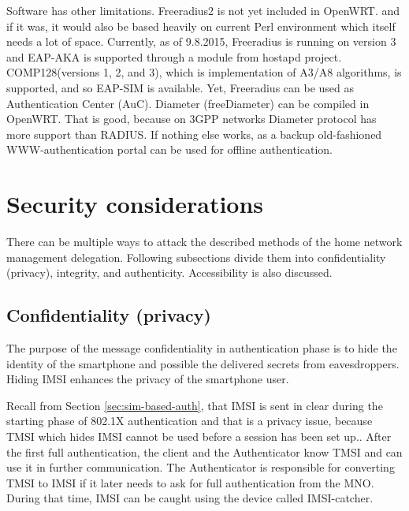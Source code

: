 \documentclass[12pt,a4paper,english]{tutthesis}
\begin{document}
\begin{otherlanguage}{english}
Software has other limitations. Freeradius2 is not yet included  in OpenWRT.
and if it was, it would also be based heavily on current Perl environment which
itself needs a lot of space.
Currently, as of 9.8.2015, Freeradius is running on version 3 and
EAP-AKA is supported through a module from hostapd project.
COMP128(versions 1, 2, and 3), which is implementation  of A3/A8
algorithms, is  supported\cite{freeradius2}, and so EAP-SIM is available.
Yet, Freeradius can be used as Authentication Center (AuC).
Diameter (freeDiameter) can be compiled in OpenWRT. That is good,
because on 3GPP networks Diameter protocol has more support than RADIUS.
If nothing else works, as a backup old-fashioned WWW-authentication
portal can be used for offline authentication.


\section{Security considerations}
\label{sec-6-4}



There can be multiple ways to attack the described methods of
the home network management delegation. Following subsections divide them into
confidentiality (privacy), integrity, and
authenticity. Accessibility is also discussed.
\subsection{Confidentiality (privacy)}
\label{sec-6-4-1}

The purpose of the message confidentiality in authentication phase is
to hide the identity of the smartphone and possible the delivered
secrets from eavesdroppers. Hiding IMSI enhances the privacy of the smartphone user. 


Recall from Section \ref{sec:sim-based-auth}, that IMSI is sent in clear 
during the starting phase of 802.1X authentication and that is a privacy 
issue, because TMSI which hides IMSI cannot be used before a session
has been set up.\cite[p.66]{rfc4186}.
After the first full authentication, the client and the Authenticator 
know TMSI and can use it in further communication. The Authenticator 
is responsible for converting  TMSI to IMSI if it later needs to 
ask for full authentication from the MNO. During that time,
IMSI can be caught using the device called IMSI-catcher.


\end{otherlanguage}
\end{document}
